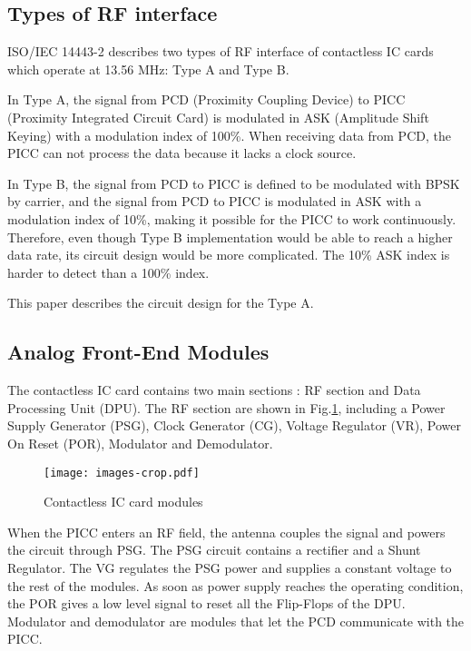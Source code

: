 \subsection{Types of RF interface}
ISO/IEC 14443-2 describes two types of RF interface of contactless IC cards which operate at 13.56 MHz: Type A and Type B. 

In Type A, the signal from PCD (Proximity Coupling Device) to PICC (Proximity Integrated Circuit Card) is modulated in ASK (Amplitude Shift Keying) with a modulation index of 100\%. When receiving data from PCD, the PICC can not process the data because it lacks a clock source. 

In Type B,  the signal from PCD to PICC is defined to be modulated with BPSK by carrier, and the signal from PCD to PICC is modulated in ASK with a modulation index of 10\%, making it possible for the PICC to work continuously. Therefore, even though Type B implementation would be able to reach a higher data rate, its circuit design would be more complicated. The 10\% ASK index is harder to detect than a 100\% index.

This paper describes the circuit design for the Type A. 


\subsection{Analog Front-End Modules}

The contactless IC card contains two main sections \cite{rfid_interface}: RF section and Data Processing Unit (DPU). The RF section are shown in Fig.\ref{fig:modules}, including a Power Supply Generator (PSG), Clock Generator (CG), Voltage Regulator (VR), Power On Reset (POR), Modulator  and Demodulator. 

\begin{figure}[]
  \centering
  \texttt{[image: images-crop.pdf]}
  \caption{Contactless IC card modules}
  \label{fig:modules}
\end{figure}

When the PICC enters an RF field, the antenna couples the signal and powers the circuit through PSG. The PSG circuit contains a rectifier and a Shunt Regulator. The VG regulates the PSG power and supplies a constant voltage to the rest of the modules. As soon as power supply reaches the operating condition, the POR gives a low level signal to reset all the Flip-Flops of the DPU. Modulator and demodulator are modules that let the PCD communicate with the PICC.